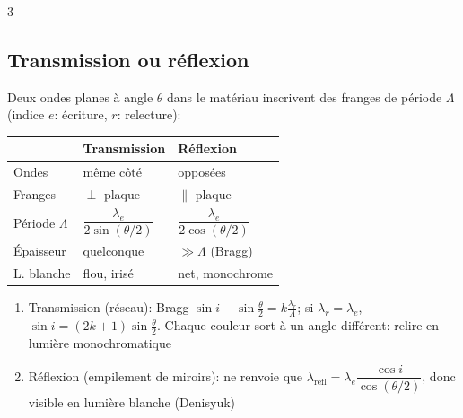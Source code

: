 \documentclass[12pt, a4paper]{article}
\begin{document}
\begin{multicols*}{3}
	\subsection{Transmission ou réflexion}
	Deux ondes planes à angle $\theta$ dans le matériau inscrivent des franges de période $\Lambda$ (indice $e$: écriture, $r$: relecture):

	\begin{tabular}{|l|l|l|}
		\hline
		                  & \textbf{Transmission}                & \textbf{Réflexion}                   \\
		\hline
		Ondes             & même côté                            & opposées                             \\
		Franges           & $\perp$ plaque                       & $\parallel$ plaque                   \\
		Période $\Lambda$ & $\dfrac{\lambda_e}{2\sin(\theta/2)}$ & $\dfrac{\lambda_e}{2\cos(\theta/2)}$ \\[6pt]
		Épaisseur         & quelconque                           & $\gg\Lambda$ (Bragg)                 \\
		L. blanche        & flou, irisé                          & net, monochrome                      \\
		\hline
	\end{tabular}
	\begin{enumerate}[\roman*.]
		\item Transmission (réseau): Bragg $\sin i-\sin\frac\theta2=k\frac{\lambda_r}{\Lambda}$; si $\lambda_r=\lambda_e$, $\sin i=(2k+1)\sin\frac\theta2$. Chaque couleur sort à un angle différent: relire en lumière monochromatique
		\item Réflexion (empilement de miroirs): ne renvoie que $\lambda_{\text{réfl}}=\lambda_e\dfrac{\cos i}{\cos(\theta/2)}$, donc visible en lumière blanche (Denisyuk)
	\end{enumerate}

	\colbreak

\end{multicols*}
\end{document}
